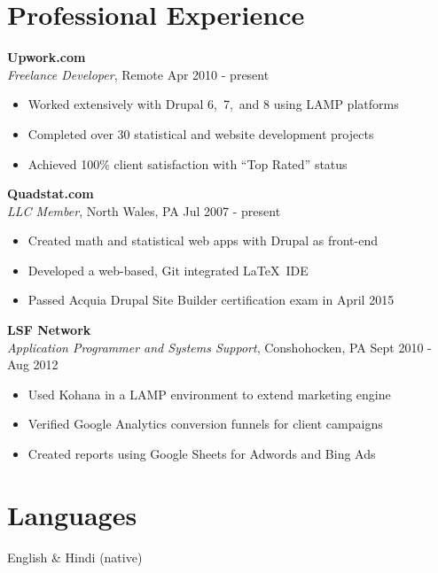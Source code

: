 \documentclass[margin,line]{res}
\begin{document}
\begin{resume}
\section{\sc Professional Experience}  {\bf Upwork.com} \\
{\em Freelance Developer}, Remote \hfill Apr 2010 - present

   \begin{itemize} \itemsep -2pt
   \item Worked extensively with Drupal 6,\ 7,\ and 8 using LAMP platforms
   \item Completed over 30 statistical and website development projects
   \item Achieved 100\% client satisfaction with ``Top Rated'' status
 \end{itemize}

{\bf Quadstat.com} \\
{\em LLC Member}, North Wales, PA \hfill Jul 2007 - present

   \begin{itemize} \itemsep -2pt
   \item Created math and statistical web apps with Drupal as front-end
   \item Developed a web-based, Git integrated \LaTeX\ IDE
   \item Passed Acquia Drupal Site Builder certification exam in April 2015

 \end{itemize}
{\bf LSF Network} \\
{\em Application Programmer and Systems Support}, Conshohocken, PA  \hfill Sept 2010 - Aug 2012

 \begin{itemize} \itemsep -2pt
  \item  Used Kohana in a LAMP environment to extend marketing engine
  \item  Verified Google Analytics conversion funnels for client campaigns
  \item  Created reports using Google Sheets for Adwords and Bing Ads
\end{itemize}

\section{\sc Languages}  English \& Hindi (native)

\end{resume}
\end{document}
